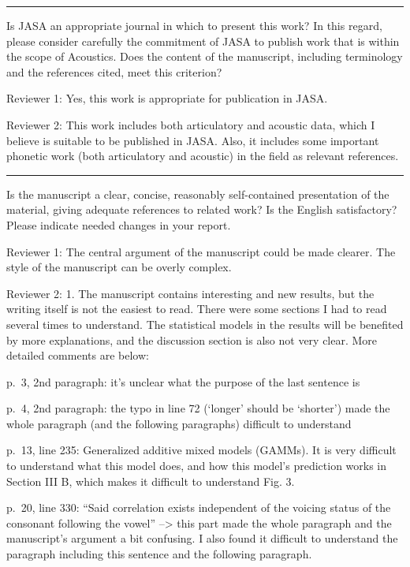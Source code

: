 \documentclass[]{article}
\begin{document}
\par

\noindent

\rule{\textwidth}{0.4pt}

Is JASA an appropriate journal in which to present this work? In this
regard, please consider carefully the commitment of JASA to publish work
that is within the scope of Acoustics. Does the content of the
manuscript, including terminology and the references cited, meet this
criterion?

Reviewer 1: Yes, this work is appropriate for publication in JASA.

Reviewer 2: This work includes both articulatory and acoustic data,
which I believe is suitable to be published in JASA. Also, it includes
some important phonetic work (both articulatory and acoustic) in the
field as relevant references.

\par

\noindent

\rule{\textwidth}{0.4pt}

Is the manuscript a clear, concise, reasonably self-contained
presentation of the material, giving adequate references to related
work? Is the English satisfactory? Please indicate needed changes in
your report.

Reviewer 1: The central argument of the manuscript could be made
clearer. The style of the manuscript can be overly complex.

Reviewer 2: 1. The manuscript contains interesting and new results, but
the writing itself is not the easiest to read. There were some sections
I had to read several times to understand. The statistical models in the
results will be benefited by more explanations, and the discussion
section is also not very clear. More detailed comments are below:

p.~3, 2nd paragraph: it's unclear what the purpose of the last sentence
is

p.~4, 2nd paragraph: the typo in line 72 (`longer' should be `shorter')
made the whole paragraph (and the following paragraphs) difficult to
understand

p.~13, line 235: Generalized additive mixed models (GAMMs). It is very
difficult to understand what this model does, and how this model's
prediction works in Section III B, which makes it difficult to
understand Fig. 3.

p.~20, line 330: ``Said correlation exists independent of the voicing
status of the consonant following the vowel'' --\textgreater{} this part
made the whole paragraph and the manuscript's argument a bit confusing.
I also found it difficult to understand the paragraph including this
sentence and the following paragraph.
\end{document}
